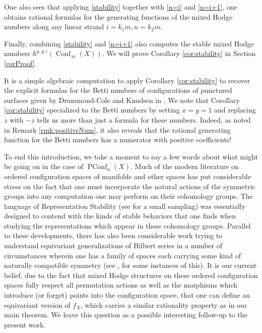 \documentclass[11pt,reqno]{amsproc}
\numberwithin{equation}{section}
\theoremstyle{definition}
\theoremstyle{remark}
\DeclareMathOperator{\Conf}{Conf}
\DeclareMathOperator{\PConf}{PConf}
\begin{document}
One also sees that applying \ref{stability} together with \ref{n=i} and \ref{n=i+1}, one obtains rational formulas for the generating functions of the mixed Hodge numbers along any linear strand $i = k_1m, n = k_2m$.

Finally, combining \ref{stability} and \ref{n=i+1} also computes the stable mixed Hodge numbers $h^{p,q;i}(\Conf_\infty(X))$. We will prove Corollary \ref{cor:stability} in Section \ref{corProof}.

It is a simple algebraic computation to apply Corollary \ref{cor:stability} to recover the explicit formulas for the Betti numbers of configurations of punctured surfaces given by Drummond-Cole and Knudsen in \cite[Proposition 3.5]{drummondcoleknudsen}. We note that Corollary \ref{cor:stability} specialized to the Betti numbers by setting $x = y = 1$ and replacing $z$ with $-z$ tells us more than just a formula for these numbers. Indeed, as noted in Remark \ref{rmk:positiveNum}, it also reveals that the rational generating function for the Betti numbers has a numerator with positive coefficients!


To end this introduction, we take a moment to say a few words about what might be going on in the case of $\PConf_n(X)$. Much of the modern literature on ordered configuration spaces of manifolds and other spaces has put considerable stress on the fact that one must incorporate the natural actions of the symmetric groups into any computation one may perform on their cohomology groups. The language of Representation Stability (see \cite{church2013representation,church2015fi,miller2019higher} for a small sampling) was essentially designed to contend with the kinds of stable behaviors that one finds when studying the representations which appear in these cohomology groups. Parallel to these developments, there has also been considerable work trying to understand equivariant generalizations of Hilbert series in a number of circumstances wherein one has a family of spaces each carrying some kind of naturally compatible symmetry (see \cite{stapledon2011equivariant,elia2024techniques}, for some instances of this). It is our current belief, due to the fact that mixed Hodge structures on these ordered configuration spaces fully respect all permutation actions as well as the morphisms which introduce (or forget) points into the configuration space, that one can define an equivariant version of $f_X$, which carries a similar rationality property as in our main theorem. We leave this question as a possible interesting follow-up to the present work.
\end{document}
